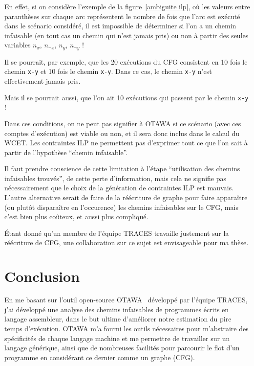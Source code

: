 \documentclass[french]{article}
\begin{document}
  En effet, si on considère l'exemple de la figure~\ref{ambiguite ilp}, où les valeurs entre paranthèses sur chaque arc représentent le nombre de fois que l'arc est exécuté dans le scénario considéré, il est impossible de déterminer si l'on a un chemin infaisable (en tout cas un chemin qui n'est jamais pris) ou non à partir des seules variables $n_x$, $n_{\neg x}$, $n_y$, $n_{\neg y}$ !

  Il se pourrait, par exemple, que les 20 exécutions du CFG consistent en 10 fois le chemin \texttt{x-\textlnot y} et 10 fois le chemin \texttt{\textlnot x-y}. Dans ce cas, le chemin \texttt{x-y} n'est effectivement jamais pris.

  Mais il se pourrait aussi, que l'on ait 10 exécutions qui passent par le chemin \texttt{x-y} !

  Dans ces conditions, on ne peut pas signifier à OTAWA si ce scénario (avec ces comptes d'exécution) est viable ou non, et il sera donc inclus dans le calcul du WCET. Les contraintes ILP ne permettent pas d'exprimer tout ce que l'on sait à partir de l'hypothèse ``chemin infaisable''.

  Il faut prendre conscience de cette limitation à l'étape ``utilisation des chemins infaisables trouvés'', de cette perte d'information, mais cela ne signifie pas nécessairement que le choix de la génération de contraintes ILP est mauvais. L'autre alternative serait de faire de la réécriture de graphe pour faire apparaître (ou plutôt disparaître en l'occurence) les chemins infaisables sur le CFG, mais c'est bien plus coûteux, et aussi plus compliqué.

  \'Etant donné qu'un membre de l'équipe TRACES travaille justement sur la réécriture de CFG, une collaboration sur ce sujet est envisageable pour ma thèse.

  \newpage{}
  \section*{Conclusion}
  En me basant sur l'outil open-source OTAWA~\cite{otawa} développé par l'équipe TRACES, j'ai développé une analyse des chemins infaisables de programmes écrits en langage assembleur, dans le but ultime d'améliorer notre estimation du pire temps d'exécution. OTAWA m'a fourni les outils nécessaires pour m'abstraire des spécificités de chaque langage machine et me permettre de travailler sur un langage générique, ainsi que de nombreuses facilités pour parcourir le flot d'un programme en considérant ce dernier comme un graphe (CFG).
  
\end{document}
